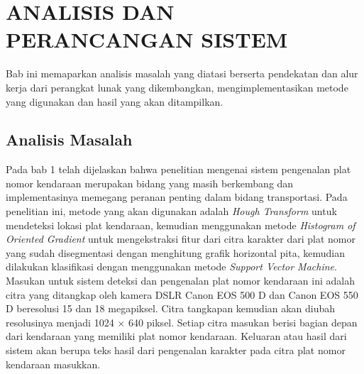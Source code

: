 \chapter{ANALISIS DAN PERANCANGAN SISTEM}

%
\vspace{4.5pt}

\noindent Bab ini memaparkan analisis masalah yang diatasi berserta pendekatan dan alur kerja dari perangkat lunak yang dikembangkan, mengimplementasikan metode yang digunakan dan hasil yang akan ditampilkan.
\\
\section{Analisis Masalah}
\noindent Pada bab 1 telah dijelaskan bahwa penelitian mengenai sistem pengenalan plat nomor kendaraan merupakan bidang yang masih berkembang dan implementasinya memegang peranan penting dalam bidang transportasi. Pada penelitian ini, metode yang akan digunakan adalah \textit{Hough Transform} untuk mendeteksi lokasi plat kendaraan, kemudian menggunakan metode \textit{Histogram of Oriented Gradient} untuk mengekstraksi fitur dari citra karakter dari plat nomor yang sudah disegmentasi dengan menghitung grafik horizontal pita, kemudian dilakukan klasifikasi dengan menggunakan metode \textit{Support Vector Machine}.
\noindent Masukan untuk sistem deteksi dan pengenalan plat nomor kendaraan ini adalah citra yang ditangkap oleh kamera DSLR Canon EOS 500 D dan Canon EOS 550 D beresolusi 15 dan 18 megapiksel. Citra tangkapan kemudian akan diubah resolusinya menjadi 1024 $\times$ 640 piksel. Setiap citra masukan berisi bagian depan dari kendaraan yang memiliki plat nomor kendaraan.
\noindent Keluaran atau hasil dari sistem akan berupa teks hasil dari pengenalan karakter pada citra plat nomor kendaraan masukkan.\\ 

